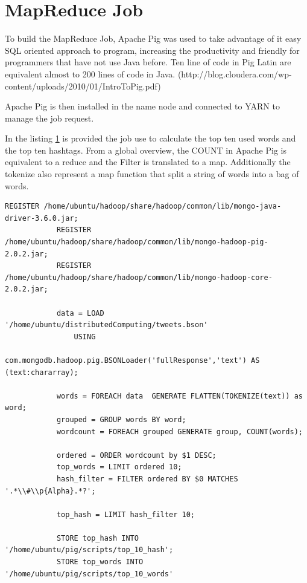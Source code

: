 \documentclass{article}
\begin{document}
        \section{MapReduce Job}

        To build the MapReduce Job, Apache Pig was used to take advantage of it easy SQL oriented approach to program, increasing the productivity and friendly for programmers that have not use Java before.
        Ten line of code in Pig Latin are equivalent almost to 200 lines of code in Java. (http://blog.cloudera.com/wp-content/uploads/2010/01/IntroToPig.pdf)

        Apache Pig is then installed in the name node and connected to YARN to manage the job request. 
        
        In the listing \ref{} is provided the job use to calculate the top ten used words and the top ten hashtags. From a global overview, the COUNT in Apache Pig is equivalent to a reduce and the Filter is translated to a map.
        Additionally the tokenize also represent a  map function that split a string of words into a bag of words.

        \begin{lstlisting}[language=Pig, caption= Tweet cleaning function, label={lst:dataCleaning}]
            REGISTER /home/ubuntu/hadoop/share/hadoop/common/lib/mongo-java-driver-3.6.0.jar;
            REGISTER /home/ubuntu/hadoop/share/hadoop/common/lib/mongo-hadoop-pig-2.0.2.jar;
            REGISTER /home/ubuntu/hadoop/share/hadoop/common/lib/mongo-hadoop-core-2.0.2.jar;
            
            data = LOAD '/home/ubuntu/distributedComputing/tweets.bson'
                USING
                com.mongodb.hadoop.pig.BSONLoader('fullResponse','text') AS (text:chararray);
            
            words = FOREACH data  GENERATE FLATTEN(TOKENIZE(text)) as word;
            grouped = GROUP words BY word;
            wordcount = FOREACH grouped GENERATE group, COUNT(words);
            
            ordered = ORDER wordcount by $1 DESC;
            top_words = LIMIT ordered 10;
            hash_filter = FILTER ordered BY $0 MATCHES '.*\\#\\p{Alpha}.*?';
            
            top_hash = LIMIT hash_filter 10;

            STORE top_hash INTO '/home/ubuntu/pig/scripts/top_10_hash';
            STORE top_words INTO '/home/ubuntu/pig/scripts/top_10_words'

        \end{lstlisting}
\end{document}
